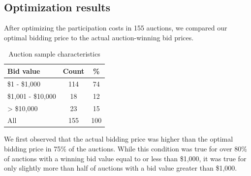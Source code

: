 \documentclass[conference]{IEEEtran}
\newcommand{\ra}[1]{\renewcommand{\arraystretch}{1.2}}
\begin{document}
\subsection{Optimization results}
\label{sec:results}
After optimizing the participation costs in 155 auctions, we compared our optimal bidding price to the actual auction-winning bid prices.

\begin{table}[htb]
    \caption{Auction sample characteristics}
    \centering
    \ra{1.3}
        \begin{tabular}{@{}lcc@{}}
            \toprule
            \bf Bid value & \bf Count & \bf \% \\ 
            \midrule
            \$1 - \$1,000 & 114 & 74 \\
            \$1,001 - \$10,000 & 18 & 12 \\ 
            > \$10,000 & 23 & 15 \\
            \hline
            All & 155 & 100 \\
            \bottomrule
        \end{tabular}
\end{table}

\begin{table}[htb]
    \caption{Optimization results}
    \centering
    \ra{1.3}
\end{table}

We first observed that the actual bidding price was higher than the optimal bidding price in 75\% of the auctions. While this condition was true for over 80\% of auctions with a winning bid value equal to or less than \$1,000, it was true for only slightly more than half of auctions with a bid value greater than \$1,000.
\end{document}
